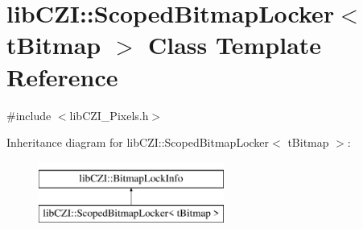\hypertarget{classlib_c_z_i_1_1_scoped_bitmap_locker}{}\section{lib\+C\+ZI\+:\+:Scoped\+Bitmap\+Locker$<$ t\+Bitmap $>$ Class Template Reference}
\label{classlib_c_z_i_1_1_scoped_bitmap_locker}


{\ttfamily \#include $<$lib\+C\+Z\+I\+\_\+\+Pixels.\+h$>$}

Inheritance diagram for lib\+C\+ZI\+:\+:Scoped\+Bitmap\+Locker$<$ t\+Bitmap $>$\+:\begin{figure}[H]
\begin{center}
\leavevmode
\includegraphics[height=2.000000cm]{classlib_c_z_i_1_1_scoped_bitmap_locker}
\end{center}
\end{figure}
